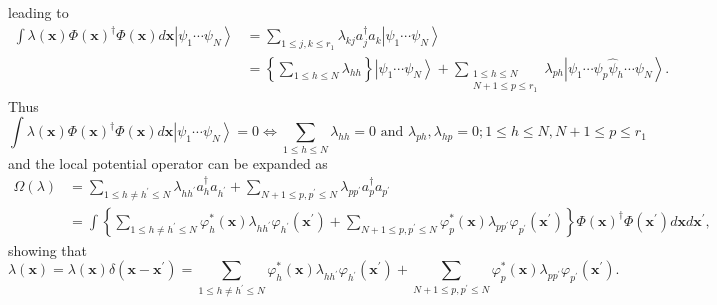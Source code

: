 \documentclass[aps,preprint]{revtex4}%
\begin{document}
leading to%
\begin{align*}
\int\lambda\left(  \mathbf{x}\right)  \Phi\left(  \mathbf{x}\right)
^{\dagger}\Phi\left(  \mathbf{x}\right)  d\mathbf{x}\left\vert \psi_{1}%
\cdots\psi_{N}\right\rangle  &  =\sum_{1\leq j,k\leq r_{1}}\lambda_{kj}%
a_{j}^{\dagger}a_{k}\left\vert \psi_{1}\cdots\psi_{N}\right\rangle \\
&  =\left\{  \sum_{1\leq h\leq N}\lambda_{hh}\right\}  \left\vert \psi
_{1}\cdots\psi_{N}\right\rangle +\sum_{\substack{1\leq h\leq N\\N+1\leq p\leq
r_{1}}}\lambda_{ph}\left\vert \psi_{1}\cdots\psi_{p}\widehat{\psi}_{h}%
\cdots\psi_{N}\right\rangle .
\end{align*}
Thus%
\[
\int\lambda\left(  \mathbf{x}\right)  \Phi\left(  \mathbf{x}\right)
^{\dagger}\Phi\left(  \mathbf{x}\right)  d\mathbf{x}\left\vert \psi_{1}%
\cdots\psi_{N}\right\rangle =0\Leftrightarrow\sum_{1\leq h\leq N}\lambda
_{hh}=0\text{ and }\lambda_{ph},\lambda_{hp}=0;1\leq h\leq N,N+1\leq p\leq
r_{1}%
\]
and the local potential operator can be expanded as
\begin{align*}
\Omega\left(  \lambda\right)   &  =\sum_{1\leq h\neq h^{\prime}\leq N}%
\lambda_{hh^{\prime}}a_{h}^{\dagger}a_{h^{\prime}}+\sum_{N+1\leq p,p^{\prime
}\leq N}\lambda_{pp^{\prime}}a_{p}^{\dagger}a_{p^{\prime}}\\
&  =\int\left\{  \sum_{1\leq h\neq h^{\prime}\leq N}\varphi_{h}^{\ast}\left(
\mathbf{x}\right)  \lambda_{hh^{\prime}}\varphi_{h^{\prime}}\left(
\mathbf{x}^{\prime}\right)  +\sum_{N+1\leq p,p^{\prime}\leq N}\varphi
_{p}^{\ast}\left(  \mathbf{x}\right)  \lambda_{pp^{\prime}}\varphi_{p^{\prime
}}\left(  \mathbf{x}^{\prime}\right)  \right\}  \Phi\left(  \mathbf{x}\right)
^{\dagger}\Phi\left(  \mathbf{x}^{\prime}\right)  d\mathbf{x}d\mathbf{x}%
^{\prime},
\end{align*}
showing that%
\[
\lambda\left(  \mathbf{x}\right)  =\lambda\left(  \mathbf{x}\right)
\delta\left(  \mathbf{x-x}^{\prime}\right)  =\sum_{1\leq h\neq h^{\prime}\leq
N}\varphi_{h}^{\ast}\left(  \mathbf{x}\right)  \lambda_{hh^{\prime}}%
\varphi_{h^{\prime}}\left(  \mathbf{x}^{\prime}\right)  +\sum_{N+1\leq
p,p^{\prime}\leq N}\varphi_{p}^{\ast}\left(  \mathbf{x}\right)  \lambda
_{pp^{\prime}}\varphi_{p^{\prime}}\left(  \mathbf{x}^{\prime}\right)  .
\]
\end{document}
